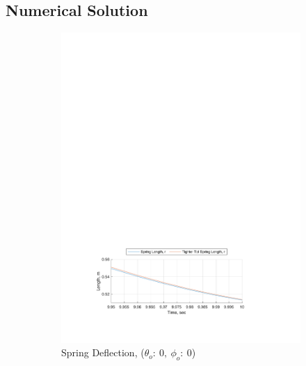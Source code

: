\documentclass[12pt]{report}
\begin{document}
\begin{flushleft}
\subsection{Numerical Solution} \label{appendix:numerical}
% 
\begin{figure}[!htp]
  \caption{Comparison Plots of ode45 Tolerance Options}
  \begin{subfigure}{\textwidth}
    \includegraphics[center]{1}
    \caption*{Spring Deflection, ($\theta_o:~0,~\phi_o:~0$)}
  \end{subfigure}
  \begin{subfigure}{\textwidth}

\end{subfigure}
\end{figure}
\end{flushleft}
\end{document}
